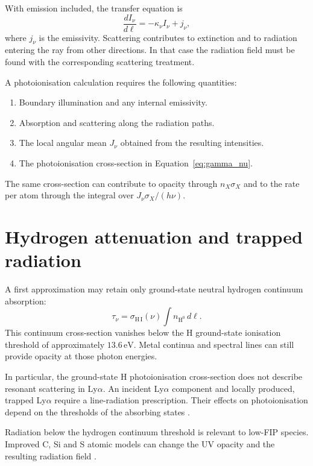 \documentclass[a4paper,10pt,twoside,openany]{book}
\newcommand{\ChapColor}{Cap1Blue}
\numberwithin{equation}{chapter}
\newenvironment{lesson}[1]{%
  \begin{tcolorbox}[bookbox,colback=white,colframe=\ChapColor,
    colbacktitle=\ChapColor,coltitle=white,
    title={#1}]}{\end{tcolorbox}}
\begin{document}
With emission included, the transfer equation is
\begin{equation}
  \frac{dI_\nu}{d\ell}=-\kappa_\nu I_\nu+j_\nu,
  \label{eq:transfer}
\end{equation}
where $j_\nu$ is the emissivity. Scattering contributes to extinction
and to radiation entering the ray from other directions. In that
case the radiation field must be found with the corresponding
scattering treatment.

\begin{lesson}{From a radiation source to an ionisation rate}
A photoionisation calculation requires the following quantities:
\begin{enumerate}
  \item Boundary illumination and any internal emissivity.
  \item Absorption and scattering along the radiation paths.
  \item The local angular mean $J_\nu$ obtained from the resulting intensities.
  \item The photoionisation cross-section in
    Equation~\eqref{eq:gamma_nu}.
\end{enumerate}
The same cross-section can contribute to opacity through
$n_X\sigma_X$ and to the rate per atom through the integral over
$J_\nu\sigma_X/(h\nu)$.
\end{lesson}

\section{Hydrogen attenuation and trapped radiation}
A first approximation may retain only ground-state neutral
hydrogen continuum absorption:
\begin{equation}
  \tau_\nu=\sigma_{\mathrm{H\,I}}(\nu)
  \int n_{\mathrm{H}^0}\,d\ell.
\end{equation}
This continuum cross-section vanishes below the H ground-state
ionisation threshold of approximately $13.6\,\mathrm{eV}$.
Metal continua and spectral lines can still provide opacity
at those photon energies.

In particular, the ground-state H photoionisation cross-section
does not describe resonant scattering in Ly$\alpha$. An incident
Ly$\alpha$ component and locally produced, trapped Ly$\alpha$
require a line-radiation prescription. Their effects on
photoionisation depend on the thresholds of the absorbing states
\cite{Laming2015}.

Radiation below the hydrogen continuum threshold is relevant to
low-FIP species. Improved C, Si and S atomic models can change the
UV opacity and the resulting radiation field
\cite{Dufresne2025}.
\end{document}
